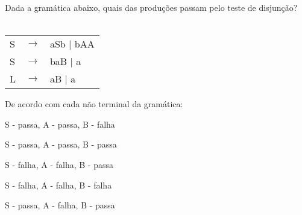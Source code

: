 \question[10]
Dada a gramática abaixo, quais das produções passam pelo teste de disjunção?\\
\\
\begin{tabular}{|l c l}
	S & $\rightarrow$ & aSb | bAA \\
    S & $\rightarrow$ & b{aB} | a \\
	L & $\rightarrow$ & aB | a \\
\end{tabular}

De acordo com cada não terminal da gramática:
\begin{choices}
\item S - passa, A - passa, B - falha %
\item S - passa, A - passa, B - passa
\item S - falha, A - falha, B - passa
\item S - falha, A - falha, B - falha
\item S - passa, A - falha, B - passa
\end{choices}
\answerline

